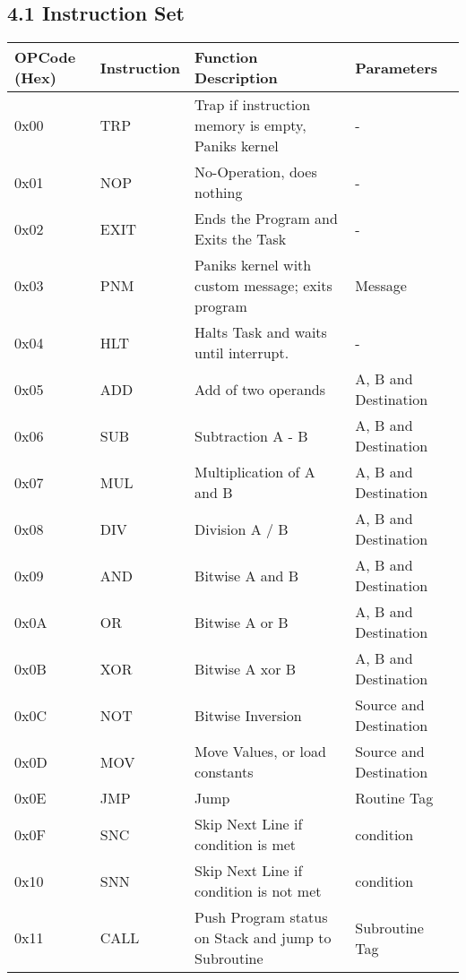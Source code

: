 \documentclass[12pt, letterpaper]{article}
\begin{document}
\subsection*{4.1 Instruction Set}
{\footnotesize
    \begin{tabularx}{\textwidth}{|p{1.3cm}|l|X|l|}
        \hline
        OPCode (Hex) & Instruction & Function Description & Parameters \\
        \hline
        0x00 & TRP & Trap if instruction memory is empty, Paniks kernel & - \\
        \hline
        0x01 & NOP & No-Operation, does nothing & - \\
        \hline
        0x02 & EXIT & Ends the Program and Exits the Task & - \\
        \hline
        0x03 & PNM & Paniks kernel with custom message; exits program & Message \\
        \hline
        0x04 & HLT & Halts Task and waits until interrupt. & - \\
        \hline
        0x05 & ADD & Add of two operands & A, B and Destination \\
        \hline
        0x06 & SUB & Subtraction A - B & A, B and Destination \\
        \hline
        0x07 & MUL & Multiplication of A and B & A, B and Destination \\
        \hline
        0x08 & DIV & Division A / B & A, B and Destination \\
        \hline
        0x09 & AND & Bitwise A and B & A, B and Destination \\
        \hline
        0x0A & OR & Bitwise A or B  & A, B and Destination \\
        \hline
        0x0B & XOR & Bitwise A xor B & A, B and Destination \\
        \hline
        0x0C & NOT & Bitwise Inversion & Source and Destination \\
        \hline
        0x0D & MOV & Move Values, or load constants & Source and Destination \\
        \hline
        0x0E & JMP & Jump & Routine Tag \\
        \hline
        0x0F & SNC & Skip Next Line if condition is met & condition \\
        \hline
        0x10 & SNN & Skip Next Line if condition is not met & condition \\
        \hline
        0x11 & CALL & Push Program status on Stack and jump to Subroutine & Subroutine Tag \\

\end{tabularx}}
\end{document}
